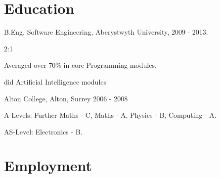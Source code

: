 \documentclass[a4paper]{article}
\renewenvironment{itemize}{
  \begin{list}{}{
    \setlength{\leftmargin}{1.5em}
  }
}{
  \end{list}
}
\newenvironment{packed}{
\begin{itemize}
  \setlength{\itemsep}{0pt}
  \setlength{\parskip}{0pt}
  \setlength{\parsep}{0pt}
}{\end{itemize}}
\begin{document}


\pagebreak

\section*{Education}

\begin{itemize}
  \item B.Eng. Software Engineering, Aberystwyth University, 2009 - 2013.
	\begin{packed}
	\item 2:1
	\item Averaged over 70\% in core Programming modules.
    \item did Artificial Intelligence modules
	\end{packed}

  \item Alton College, Alton, Surrey 2006 - 2008
	\begin{packed}
	\item A-Levels: Further Maths - C, Maths - A, Physics - B, Computing - A.
	\item AS-Level: Electronics - B.
	\end{packed}

\end{itemize}


\section*{Employment}
\end{document}
